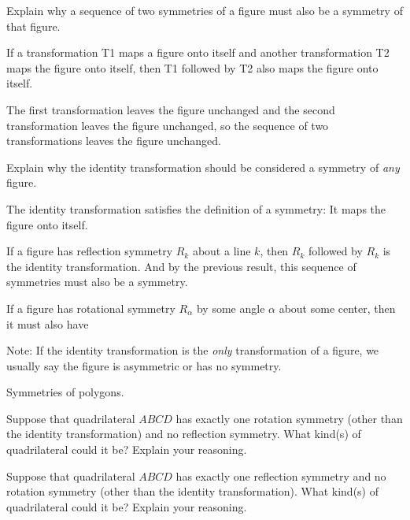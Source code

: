 \documentclass[nooutcomes]{ximera}
\begin{document}
\begin{question}
Explain why a sequence of two symmetries of a figure must also be a symmetry of that figure.  
\begin{freeResponse}
\begin{hint}
If a transformation T1 maps a figure onto itself and another transformation T2 maps the figure onto itself, then T1 followed by T2 also maps the figure onto itself.  

The first transformation leaves the figure unchanged and the second transformation leaves the figure unchanged, so the sequence of two transformations leaves the figure unchanged.  
\end{hint}
\end{freeResponse}
\end{question}

\begin{question}
Explain why the identity transformation should be considered a symmetry of \emph{any} figure.   
\begin{freeResponse}
\begin{hint}
The identity transformation satisfies the definition of a symmetry: It maps the figure onto itself. 

If a figure has reflection symmetry $R_k$ about a line $k$, then $R_k$ followed by $R_k$ is the identity transformation.  And by the previous result, this sequence of symmetries must also be a symmetry.  

If a figure has rotational symmetry $R_\alpha$ by some angle $\alpha$ about some center, then it must also have 

Note: If the identity transformation is the \emph{only} transformation of a figure, we usually say the figure is asymmetric or has no symmetry.  
\end{hint}
\end{freeResponse}
\end{question}


Symmetries of polygons.  

\begin{question}
Suppose that quadrilateral $ABCD$ has exactly one rotation symmetry (other than the identity transformation) and no reflection symmetry.  What kind(s) of quadrilateral could it be?  Explain your reasoning.  
\end{question}

\begin{question}
Suppose that quadrilateral $ABCD$ has exactly one reflection symmetry and no rotation symmetry (other than the identity transformation).  What kind(s) of quadrilateral could it be?  Explain your reasoning.  
\end{question}
\end{document}
